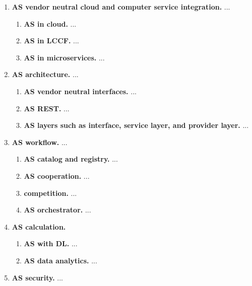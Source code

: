 \begin{enumerate}

\item{\bf AS vendor neutral cloud and computer service integration.} ...

  \begin{enumerate}
    \item {\bf AS in cloud.} ...
    \item {\bf AS in LCCF.} ...
    \item {\bf AS in microservices.} ...
  \end{enumerate}

\item{\bf AS architecture.} ...

  \begin{enumerate}
    \item{\bf AS vendor neutral interfaces.} ...
    \item{\bf AS REST.} ...
    \item{\bf AS layers such as interface, service layer, and provider layer.} ...
  \end{enumerate}

\item{\bf AS workflow.} ...

  \begin{enumerate}
    \item{\bf AS catalog and registry.} ...
    \item{\bf AS cooperation.} ...
    \item{\bf competition.} ...
    \item{\bf AS orchestrator.} ...
  \end{enumerate}


\item{\bf AS calculation.}

  \begin{enumerate}
    \item{\bf AS with DL.} ...
    \item{\bf AS data analytics.} ...
  \end{enumerate}

\item{\bf AS security.} ...

\end{enumerate}


